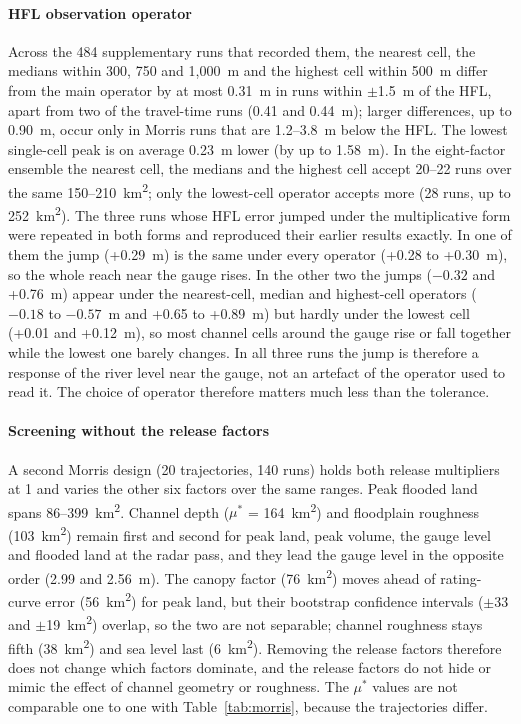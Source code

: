 \documentclass[preprint,12pt,authoryear]{elsarticle}
\newcommand{\kmsq}{km\textsuperscript{2}}
\begin{document}
\paragraph{HFL observation operator} Across the 484 supplementary runs that recorded them, the nearest cell, the medians within 300, 750 and 1,000~m and the highest cell within 500~m differ from the main operator by at most 0.31~m in runs within $\pm$1.5~m of the HFL, apart from two of the travel-time runs (0.41 and 0.44~m); larger differences, up to 0.90~m, occur only in Morris runs that are 1.2--3.8~m below the HFL. The lowest single-cell peak is on average 0.23~m lower (by up to 1.58~m). In the eight-factor ensemble the nearest cell, the medians and the highest cell accept 20--22 runs over the same 150--210~\kmsq; only the lowest-cell operator accepts more (28 runs, up to 252~\kmsq). The three runs whose HFL error jumped under the multiplicative form were repeated in both forms and reproduced their earlier results exactly. In one of them the jump (+0.29~m) is the same under every operator (+0.28 to +0.30~m), so the whole reach near the gauge rises. In the other two the jumps ($-0.32$ and +0.76~m) appear under the nearest-cell, median and highest-cell operators ($-0.18$ to $-0.57$~m and +0.65 to +0.89~m) but hardly under the lowest cell (+0.01 and +0.12~m), so most channel cells around the gauge rise or fall together while the lowest one barely changes. In all three runs the jump is therefore a response of the river level near the gauge, not an artefact of the operator used to read it. The choice of operator therefore matters much less than the tolerance.

\paragraph{Screening without the release factors} A second Morris design (20 trajectories, 140 runs) holds both release multipliers at 1 and varies the other six factors over the same ranges. Peak flooded land spans 86--399~\kmsq. Channel depth ($\mu^*$ = 164~\kmsq) and floodplain roughness (103~\kmsq) remain first and second for peak land, peak volume, the gauge level and flooded land at the radar pass, and they lead the gauge level in the opposite order (2.99 and 2.56~m). The canopy factor (76~\kmsq) moves ahead of rating-curve error (56~\kmsq) for peak land, but their bootstrap confidence intervals ($\pm$33 and $\pm$19~\kmsq) overlap, so the two are not separable; channel roughness stays fifth (38~\kmsq) and sea level last (6~\kmsq). Removing the release factors therefore does not change which factors dominate, and the release factors do not hide or mimic the effect of channel geometry or roughness. The $\mu^*$ values are not comparable one to one with Table~\ref{tab:morris}, because the trajectories differ.
\end{document}
